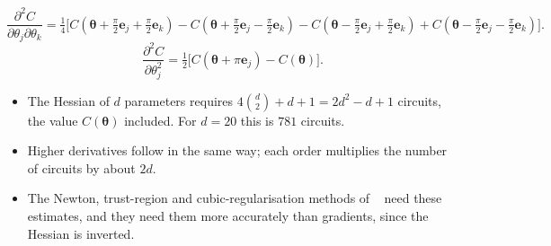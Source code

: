 \documentclass[handoutsbeamer.tex]{subfiles}
\begin{document}
\begin{frame}
\onp{\footnotesize}
\begin{equation}\label{eq:ch07:hessmixed}
    \frac{\partial^2C}{\partial\theta_j\partial\theta_k} = \tfrac14\big[C(\boldsymbol\theta+\tfrac\pi2\boldsymbol e_j+\tfrac\pi2\boldsymbol e_k) - C(\boldsymbol\theta+\tfrac\pi2\boldsymbol e_j-\tfrac\pi2\boldsymbol e_k) - C(\boldsymbol\theta-\tfrac\pi2\boldsymbol e_j+\tfrac\pi2\boldsymbol e_k) + C(\boldsymbol\theta-\tfrac\pi2\boldsymbol e_j-\tfrac\pi2\boldsymbol e_k)\big].
\end{equation}
\begin{equation}\label{eq:ch07:hessdiag}
    \frac{\partial^2C}{\partial\theta_j^2} = \tfrac12\big[C(\boldsymbol\theta+\pi\boldsymbol e_j) - C(\boldsymbol\theta)\big].
\end{equation}
\begin{itemize}\setlength\itemsep{0.2em}
    \item The Hessian of $d$ parameters requires $4\binom d2 + d + 1 = 2d^2-d+1$ circuits, the value $C(\boldsymbol\theta)$ included. For $d = 20$ this is $781$ circuits.
    \item Higher derivatives follow in the same way; each order multiplies the number of circuits by about $2d$.
    \item The Newton, trust-region and cubic-regularisation methods of \Chap~ need these estimates, and they need them more accurately than gradients, since the Hessian is inverted.
\end{itemize}
\end{frame}
\end{document}
